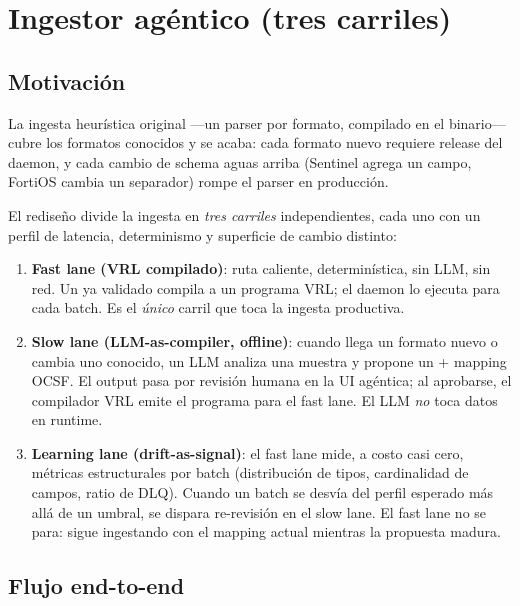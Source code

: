\chapter{Ingestor agéntico (tres carriles)}
\label{sec:ingestor-agentico}

\section{Motivación}

La ingesta heurística original —un parser por formato, compilado en
el binario— cubre los formatos conocidos y se acaba: cada formato
nuevo requiere release del daemon, y cada cambio de schema aguas
arriba (Sentinel agrega un campo, FortiOS cambia un separador)
rompe el parser en producción.

El rediseño divide la ingesta en \emph{tres carriles}
independientes, cada uno con un perfil de latencia, determinismo y
superficie de cambio distinto:

\begin{enumerate}
    \item \textbf{Fast lane (VRL compilado)}: ruta caliente,
    determinística, sin LLM, sin red. Un  ya
    validado compila a un programa VRL; el daemon lo ejecuta para
    cada batch. Es el \emph{único} carril que toca la ingesta
    productiva.
    \item \textbf{Slow lane (LLM-as-compiler, offline)}: cuando
    llega un formato nuevo o cambia uno conocido, un LLM analiza una
    muestra y propone un  + mapping OCSF. El
    output pasa por revisión humana en la UI agéntica; al aprobarse,
    el compilador VRL emite el programa para el fast lane. El LLM
    \emph{no} toca datos en runtime.
    \item \textbf{Learning lane (drift-as-signal)}: el fast lane
    mide, a costo casi cero, métricas estructurales por batch
    (distribución de tipos, cardinalidad de campos, ratio de DLQ).
    Cuando un batch se desvía del perfil esperado más allá de un
    umbral, se dispara re-revisión en el slow lane. El fast lane no
    se para: sigue ingestando con el mapping actual mientras la
    propuesta madura.
\end{enumerate}

\section{Flujo end-to-end}

